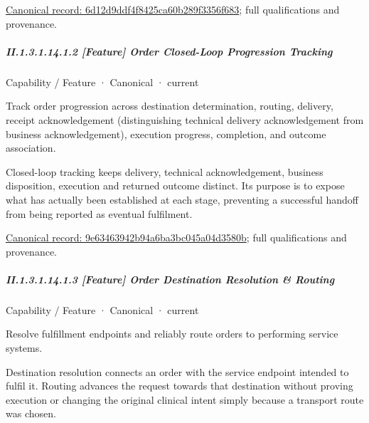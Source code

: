 {\footnotesize \href{../../../../continuum/strategy/capability/feature/6d12d9ddf4f8425ca60b289f3356f683.md}{Canonical record: 6d12d9ddf4f8425ca60b289f3356f683}; full qualifications and provenance.}\par
\subparagraph*{II.1.3.1.14.1.2 [Feature] Order Closed-Loop Progression Tracking}
\label{navigation:II.1.3.1.14.1.2}

\label{element:9e63463942b94a6ba3bc045a04d3580b}
{\small Capability / Feature · Canonical · current}\par

Track order progression across destination determination, routing, delivery, receipt acknowledgement (distinguishing technical delivery acknowledgement from business acknowledgement), execution progress, completion, and outcome association.



Closed-loop tracking keeps delivery, technical acknowledgement, business disposition, execution and returned outcome distinct. Its purpose is to expose what has actually been established at each stage, preventing a successful handoff from being reported as eventual fulfilment.


{\footnotesize \href{../../../../continuum/strategy/capability/feature/9e63463942b94a6ba3bc045a04d3580b.md}{Canonical record: 9e63463942b94a6ba3bc045a04d3580b}; full qualifications and provenance.}\par
\subparagraph*{II.1.3.1.14.1.3 [Feature] Order Destination Resolution \& Routing}
\label{navigation:II.1.3.1.14.1.3}

\label{element:9f8f1542efc64e89ad226689291f2635}
{\small Capability / Feature · Canonical · current}\par

Resolve fulfillment endpoints and reliably route orders to performing service systems.



Destination resolution connects an order with the service endpoint intended to fulfil it. Routing advances the request towards that destination without proving execution or changing the original clinical intent simply because a transport route was chosen.


